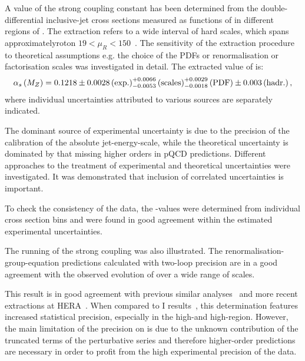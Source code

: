 A value of the strong coupling constant has been determined from the double-differential inclusive-jet cross sections measured as functions of \etjetb in different regions of \qsq. The extraction refers to a wide interval of hard scales, which spans approximatelyroton $19 < \mu_R < 150$~\GeV. The sensitivity of the extraction procedure to theoretical assumptions e.g. the choice of the PDFs or renormalisation or factorisation scales was investigated in detail. The extracted value of \asz is:
\begin{equation}
 \mbox{$\alpha_{s}\left(M_{Z}\right)$} = 0.1218 \pm 0.0028\left(\text{exp.}\right)^{+0.0066}_{-0.0053}\left(\text{scales}\right)^{+0.0029}_{-0.0018}\left(\text{PDF}\right)\pm{0.003}\left(\text{hadr.}\right),
\end{equation}
where individual uncertainties attributed to various sources are separately indicated. 

The dominant source of experimental uncertainty is due to the precision of the calibration of the absolute jet-energy-scale, while the theoretical uncertainty is dominated by that missing higher orders in pQCD predictions.
Different approaches to the treatment of experimental and theoretical uncertainties were investigated. It was demonstrated that inclusion of correlated uncertainties is important. 

To check the consistency of the data, the \asz-values were determined from individual cross section bins and were found in good agreement within the estimated experimental uncertainties.

The running of the strong coupling was also illustrated. The renormalisation-group-equation predictions calculated with two-loop precision are in a good agreement with the observed evolution of \as over a wide range of scales.
 
This result is in good agreement with previous similar analyses~\cite{HERAIjets} and more recent extractions at HERA~\cite{britzger}. When compared to \hera I results~\cite{}, this determination features increased statistical precision, especially in the high-\etjetb and high-\qsq region. However, the main limitation of the precision on \asz is due to the unknown contribution of the truncated terms of the perturbative series and therefore higher-order predictions are necessary in order to profit from the high experimental precision of the data.